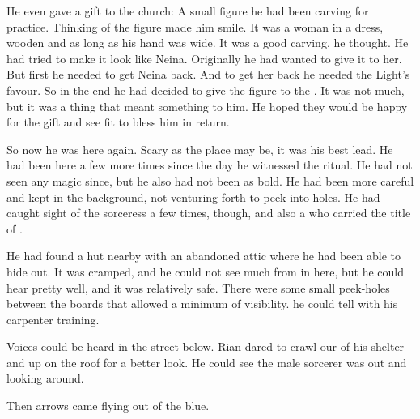 He even gave a gift to the church: 
A small figure he had been carving for practice. 
Thinking of the figure made him smile. 
It was a woman in a dress, wooden and as long as his hand was wide. 
It was a good carving, he thought. 
He had tried to make it look like Neina. 
Originally he had wanted to give it to her. 
But first he needed to get Neina back. 
And to get her back he needed the Light's favour. 
So in the end he had decided to give the figure to the \sephiroth. 
It was not much, but it was a thing that meant something to him. 
He hoped they would be happy for the gift and see fit to bless him in return. 

So now he was here again. 
Scary as the place may be, it was his best lead. 
He had been here a few more times since the day he witnessed the ritual.
He had not seen any magic since, but he also had not been as bold. 
He had been more careful and kept in the background, not venturing forth to peek into holes. 
He had caught sight of the sorceress a few times, though, and also a \dax{} who carried the title of .

He had found a hut nearby with an abandoned attic where he had been able to hide out. 
It was cramped, and he could not see much from in here, but he could hear pretty well, and it was relatively safe. 
There were some small peek-holes between the boards that allowed a minimum of visibility. 
 he could tell with his carpenter training. 

Voices could be heard in the street below. 
Rian dared to crawl our of his shelter and up on the roof for a better look. 
He could see the male sorcerer was out and looking around. 


Then arrows came flying out of the blue. 

